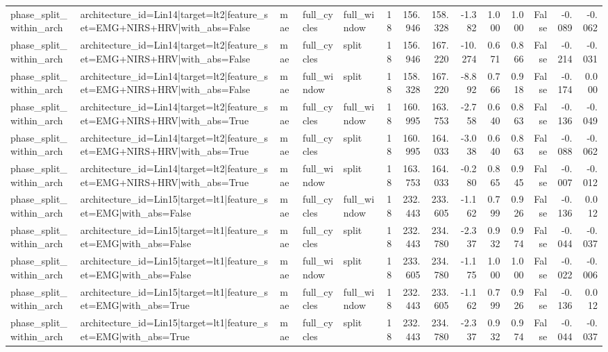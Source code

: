 \begin{table}
\begin{tabular}{lllllrrrrrrrrr}
phase_split_within_arch & architecture_id=Lin14|target=lt2|feature_set=EMG+NIRS+HRV|with_abs=False & mae & full_cycles & full_window & 18 & 156.946 & 158.328 & -1.382 & 1.000 & 1.000 & False & -0.089 & -0.062 \\
phase_split_within_arch & architecture_id=Lin14|target=lt2|feature_set=EMG+NIRS+HRV|with_abs=False & mae & full_cycles & split & 18 & 156.946 & 167.220 & -10.274 & 0.671 & 0.866 & False & -0.214 & -0.031 \\
phase_split_within_arch & architecture_id=Lin14|target=lt2|feature_set=EMG+NIRS+HRV|with_abs=False & mae & full_window & split & 18 & 158.328 & 167.220 & -8.892 & 0.766 & 0.918 & False & -0.174 & 0.000 \\
phase_split_within_arch & architecture_id=Lin14|target=lt2|feature_set=EMG+NIRS+HRV|with_abs=True & mae & full_cycles & full_window & 18 & 160.995 & 163.753 & -2.758 & 0.640 & 0.863 & False & -0.136 & -0.049 \\
phase_split_within_arch & architecture_id=Lin14|target=lt2|feature_set=EMG+NIRS+HRV|with_abs=True & mae & full_cycles & split & 18 & 160.995 & 164.033 & -3.038 & 0.640 & 0.863 & False & -0.088 & -0.062 \\
phase_split_within_arch & architecture_id=Lin14|target=lt2|feature_set=EMG+NIRS+HRV|with_abs=True & mae & full_window & split & 18 & 163.753 & 164.033 & -0.280 & 0.865 & 0.945 & False & -0.007 & -0.012 \\
phase_split_within_arch & architecture_id=Lin15|target=lt1|feature_set=EMG|with_abs=False & mae & full_cycles & full_window & 18 & 232.443 & 233.605 & -1.162 & 0.799 & 0.926 & False & -0.136 & 0.012 \\
phase_split_within_arch & architecture_id=Lin15|target=lt1|feature_set=EMG|with_abs=False & mae & full_cycles & split & 18 & 232.443 & 234.780 & -2.337 & 0.932 & 0.974 & False & -0.044 & -0.037 \\
phase_split_within_arch & architecture_id=Lin15|target=lt1|feature_set=EMG|with_abs=False & mae & full_window & split & 18 & 233.605 & 234.780 & -1.175 & 1.000 & 1.000 & False & -0.022 & -0.006 \\
phase_split_within_arch & architecture_id=Lin15|target=lt1|feature_set=EMG|with_abs=True & mae & full_cycles & full_window & 18 & 232.443 & 233.605 & -1.162 & 0.799 & 0.926 & False & -0.136 & 0.012 \\
phase_split_within_arch & architecture_id=Lin15|target=lt1|feature_set=EMG|with_abs=True & mae & full_cycles & split & 18 & 232.443 & 234.780 & -2.337 & 0.932 & 0.974 & False & -0.044 & -0.037 \\

\end{tabular}
\end{table}

